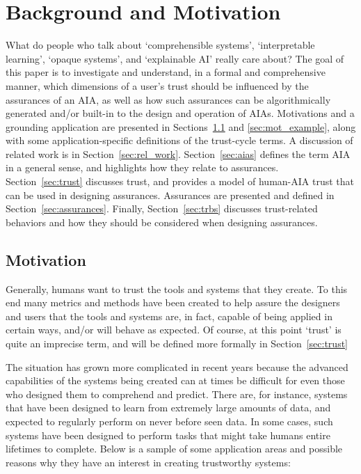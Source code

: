 \section{Background and Motivation} \label{sec:background}

What do people who talk about `comprehensible systems', `interpretable learning', `opaque systems', and `explainable AI' really care about? The goal of this paper is to investigate and understand, in a formal and comprehensive manner, which dimensions of a user's trust should be influenced by the assurances of an AIA, as well as how such assurances can be algorithmically generated and/or built-in to the design and operation of AIAs. Motivations and a grounding application are presented in Sections~\ref{sec:motivation} and \ref{sec:mot_example}, along with some application-specific definitions of the trust-cycle terms. A discussion of related work is in Section~\ref{sec:rel_work}. Section~\ref{sec:aias} defines the term AIA in a general sense, and highlights how they relate to assurances. Section~\ref{sec:trust} discusses trust, and provides a model of human-AIA trust that can be used in designing assurances. Assurances are presented and defined in Section~\ref{sec:assurances}. Finally, Section~\ref{sec:trbs} discusses trust-related behaviors and how they should be considered when designing assurances.

\subsection{Motivation} \label{sec:motivation}
    Generally, humans want to trust the tools and systems that they create.  To this end many metrics and methods have been created to help assure the designers and users that the tools and systems are, in fact, capable of being applied in certain ways, and/or will behave as expected. Of course, at this point `trust' is quite an imprecise term, and will be defined more formally in Section~\ref{sec:trust}

    The situation has grown more complicated in recent years because the advanced capabilities of the systems being created can at times be difficult for even those who designed them to comprehend and predict. There are, for instance, systems that have been designed to learn from extremely large amounts of data, and expected to regularly perform on never before seen data. In some cases, such systems have been designed to perform tasks that might take humans entire lifetimes to complete. Below is a sample of some application areas and possible reasons why they have an interest in creating trustworthy systems:

